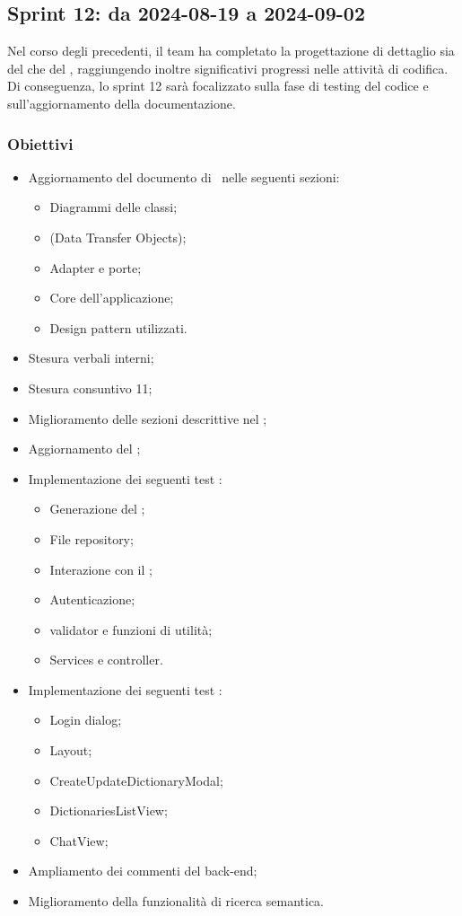 \subsection{Sprint 12: da 2024-08-19 a 2024-09-02}
\par Nel corso degli  precedenti, il team ha completato la progettazione di dettaglio sia del  che del , raggiungendo inoltre significativi progressi nelle attività di codifica. Di conseguenza, lo sprint 12 sarà focalizzato sulla fase di testing del codice e sull'aggiornamento della documentazione.

\subsubsection{Obiettivi}
\begin{itemize}
  \item Aggiornamento del documento di \ST\ nelle seguenti sezioni:
  \begin{itemize}
    \item Diagrammi delle classi;
    \item {} (Data Transfer Objects);
    \item Adapter e porte;
    \item Core dell'applicazione;
    \item Design pattern utilizzati.
  \end{itemize}
  \item Stesura verbali interni;
  \item Stesura consuntivo  11;
  \item Miglioramento delle sezioni descrittive nel \MU; 
  \item Aggiornamento del \PdQ;
  \item Implementazione dei seguenti test :
  \begin{itemize}
    \item Generazione del ;
    \item File repository;
    \item Interazione con il ;
    \item Autenticazione;
    \item {} validator e funzioni di utilità;
    \item Services e controller.
  \end{itemize}
  \item Implementazione dei seguenti test :
  \begin{itemize}
    \item Login dialog;
    \item Layout;
    \item CreateUpdateDictionaryModal;
    \item DictionariesListView;
    \item ChatView;
  \end{itemize}
  \item Ampliamento dei commenti del back-end;
  \item Miglioramento della funzionalità di ricerca semantica.
\end{itemize}

